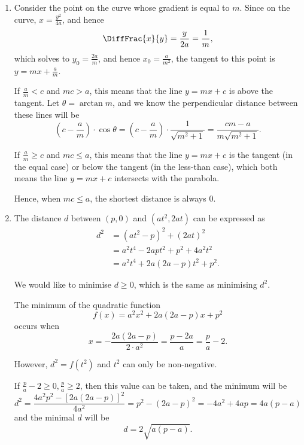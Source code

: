 \Question{\currfilebase}

\begin{enumerate}
    \item Consider the point on the curve whose gradient is equal to \(m\). Since on the curve, \(x = \frac{y^2}{4a}\), and hence
          \[
              \DiffFrac{x}{y} = \frac{y}{2a} = \frac{1}{m},
          \]
          which solves to \(y_0 = \frac{2a}{m}\), and hence \(x_0 = \frac{a}{m^2}\), the tangent to this point is \(y = mx + \frac{a}{m}\).

          If \(\frac{a}{m} < c\) and \(mc > a\), this means that the line \(y = mx + c\) is above the tangent. Let \(\theta = \arctan m\), and we know the perpendicular distance between these lines will be
          \[
              \left(c - \frac{a}{m}\right) \cdot \cos \theta = \left(c - \frac{a}{m}\right) \cdot \frac{1}{\sqrt{m^2 + 1}} = \frac{cm - a}{m \sqrt{m^2 + 1}}.
          \]

          If \(\frac{a}{m} \geq c\) and \(mc \leq a\), this means that the line \(y = mx + c\) is the tangent (in the equal case) or below the tangent (in the less-than case), which both means the line \(y = mx + c\) intersects with the parabola.

          Hence, when \(mc \leq a\), the shortest distance is always \(0\).

    \item The distance \(d\) between \((p, 0)\) and \((at^2, 2at)\) can be expressed as
          \begin{align*}
              d^2 & = (at^2 - p)^2 + (2at)^2           \\
                  & = a^2 t^4 - 2apt^2 + p^2 + 4a^2t^2 \\
                  & = a^2 t^4  + 2a(2a - p)t^2 + p^2.
          \end{align*}

          We would like to minimise \(d \geq 0\), which is the same as minimising \(d^2\).

          The minimum of the quadratic function
          \[
              f(x) = a^2 x^2 + 2a(2a-p)x + p^2
          \]
          occurs when
          \[
              x = -\frac{2a(2a - p)}{2 \cdot a^2} = \frac{p - 2a}{a} = \frac{p}{a} - 2.
          \]

          However, \(d^2 = f(t^2)\) and \(t^2\) can only be non-negative.

          If \(\frac{p}{a} - 2 \geq 0, \frac{p}{a} \geq 2\), then this value can be taken, and the minimum will be
          \[
              d^2 = \frac{4 a^2 p^2 - \left[2a(2a - p)\right]^2}{4 a^2} = p^2 - (2a - p)^2 = - 4a^2 + 4ap = 4a(p - a)
          \]
          and the minimal \(d\) will be
          \[
              d = 2\sqrt{a(p - a)}.
          \]


\end{enumerate}
